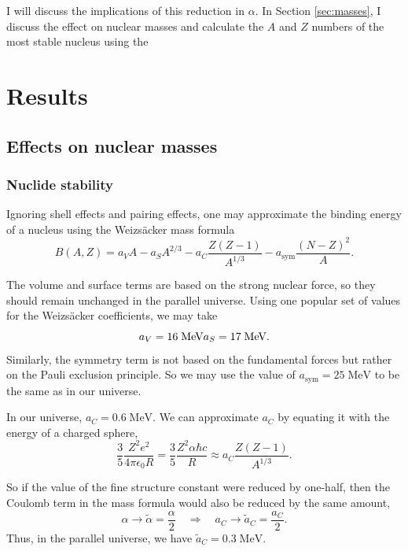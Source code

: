 \documentclass[%
 reprint,
 amsmath,amssymb,
 aps,
]{revtex4-1}
\begin{document}
I will discuss the implications of this reduction in $\alpha$. In Section \ref{sec:masses}, I discuss the effect on nuclear masses and calculate the $A$ and $Z$ numbers of the most stable nucleus using the

\section{\label{sec:conclusion}Results}

\subsection{\label{sec:masses}Effects on nuclear masses}

\subsubsection{\label{sec:table_of_nuclides}Nuclide stability}

Ignoring shell effects and pairing effects, one may approximate the binding energy of a nucleus using the Weizs\"acker mass formula\cite{1935ZPhy...96..431W}
\begin{equation}
    B(A, Z) = a_V A - a_S A^{2/3} - a_C \frac{Z (Z-1)}{A^{1/3}}
    - a_{\text{sym}} \frac{(N-Z)^2}{A}.
    \label{eq:weizsacker}
\end{equation}

The volume and surface terms are based on the strong nuclear force, so they should remain unchanged in the parallel universe. Using one popular set of values for the Weizs\"acker coefficients\cite{wong1990introductory}, we may take
\begin{equation}
    a_V = 16 \; \text{MeV} \\
    a_S = 17 \; \text{MeV}.
\end{equation}
Similarly, the symmetry term is not based on the fundamental forces but rather on the Pauli exclusion principle. So we may use the value of $a_{\text{sym}} = 25 \; \text{MeV}$ to be the same as in our universe.\cite{wong1990introductory}

In our universe, $a_C = 0.6 \; \text{MeV}$. We can approximate $a_C$ by equating it with the energy of a charged sphere,
\begin{equation}
    \frac{3}{5} \frac{Z^2 e^2}{4 \pi \epsilon_0 R} = 
    \frac{3}{5} \frac{Z^2 \alpha \hbar c}{R}
    \approx a_C \frac{Z(Z-1)}{A^{1/3}}.
\end{equation}

So if the value of the fine structure constant were reduced by one-half, then the Coulomb term in the mass formula would also be reduced by the same amount,
\begin{equation}
    \alpha \rightarrow \widetilde{\alpha} = \frac{\alpha}{2}
    \quad \Longrightarrow \quad
    a_C \rightarrow \widetilde{a}_C = \frac{a_C}{2}.
\end{equation}
Thus, in the parallel universe, we have $\widetilde{a}_C = 0.3 \; \text{MeV}$.
\end{document}
